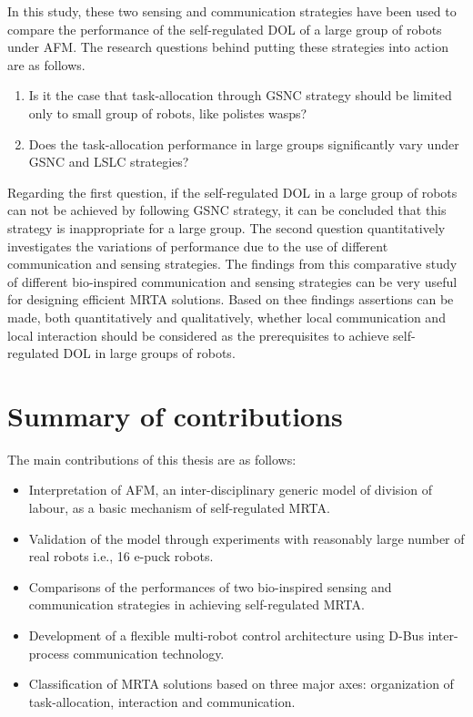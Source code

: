 In this study, these two sensing and communication strategies have been used to compare the performance of the self-regulated DOL of a large group of robots under AFM. %
The research questions behind putting these strategies into action are as follows.
\begin{enumerate}
\item Is it the case that task-allocation through GSNC strategy should be limited only to small group of robots, like polistes wasps?
\item 
Does the task-allocation performance in large groups significantly vary under GSNC and LSLC strategies?
\end{enumerate}
Regarding the first question, if the self-regulated DOL in a large group of robots can not be achieved by following GSNC strategy, it can be concluded that this strategy is inappropriate for a large group. The second question quantitatively investigates the variations of performance due to the use of different communication and sensing strategies. The findings from this comparative study of different bio-inspired communication and sensing strategies can be very useful for designing efficient MRTA solutions. Based on thee findings assertions can be made, both quantitatively and qualitatively, whether local communication and local interaction should be considered as the prerequisites to achieve self-regulated DOL in large groups of robots.
\section{Summary of contributions}
The main contributions of this thesis are as follows:
\begin{itemize}
\item Interpretation of AFM, an inter-disciplinary generic model of division of labour, as a basic mechanism of self-regulated MRTA.
\item Validation of the model through experiments with reasonably large number of real robots i.e., 16 e-puck robots.
\item Comparisons of the performances of two bio-inspired sensing and communication strategies in achieving self-regulated MRTA.
\item Development of a flexible multi-robot control architecture using D-Bus inter-process communication technology.
\item Classification of MRTA solutions based on three major axes: organization of task-allocation, interaction and communication.
\end{itemize}

